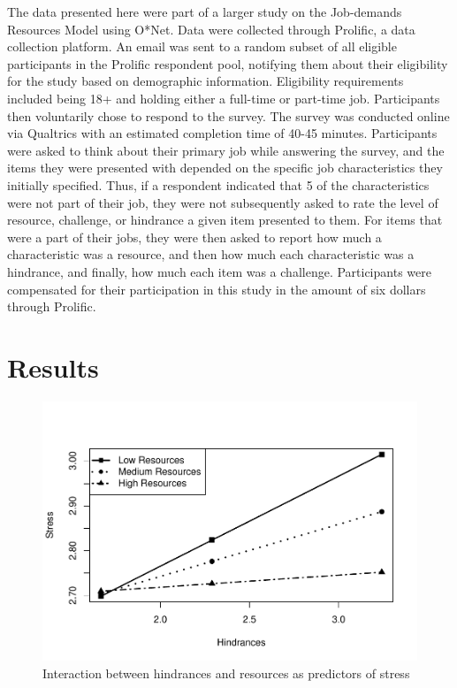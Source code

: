 \documentclass[
  man]{apa6}
\begin{document}
The data presented here were part of a larger study on the Job-demands Resources Model using O*Net. Data were collected through Prolific, a data collection platform. An email was sent to a random subset of all eligible participants in the Prolific respondent pool, notifying them about their eligibility for the study based on demographic information. Eligibility requirements included being 18+ and holding either a full-time or part-time job. Participants then voluntarily chose to respond to the survey. The survey was conducted online via Qualtrics with an estimated completion time of 40-45 minutes. Participants were asked to think about their primary job while answering the survey, and the items they were presented with depended on the specific job characteristics they initially specified. Thus, if a respondent indicated that 5 of the characteristics were not part of their job, they were not subsequently asked to rate the level of resource, challenge, or hindrance a given item presented to them. For items that were a part of their jobs, they were then asked to report how much a characteristic was a resource, and then how much each characteristic was a hindrance, and finally, how much each item was a challenge. Participants were compensated for their participation in this study in the amount of six dollars through Prolific.

\hypertarget{results}{%
\section{Results}\label{results}}

\begin{figure}
\centering
\includegraphics{SIOP_PROCESS_files/figure-latex/analyses-1.pdf}
\caption{\label{fig:analyses}Interaction between hindrances and resources as predictors of stress}
\end{figure}
\end{document}
